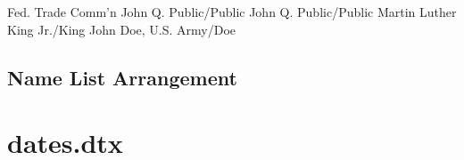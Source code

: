 \documentclass{article}
\begin{document}
    {Fed. Trade Comm'n}
\def\TestNameprocPerson#1#2#3{#3{#1/#2}}
\AssertCallback
    {\TestNameprocPerson}
    {John Q. Public/Public}
\AssertCallback
    {\TestNameprocPerson}
    {John Q. Public\hi@etal/Public\hi@etal}
\AssertCallback
    {\TestNameprocPerson}
    {Martin Luther King Jr.\hi@etal/King\hi@etal}
\AssertCallback
    {\TestNameprocPerson}
    {John Doe, U.S. Army/Doe}

\subsection{Name List Arrangement}

\begingroup

\hi@undefine\hi@kv@test
\let\hi@param@set@hooks\relax
{}\hi@kv@test
\AssertMacro{}
\hi@kv@test
\AssertMacro{}
\hi@kv@test
\AssertMacro{}
\hi@kv@test
\AssertMacro{}
\hi@kv@test
\AssertMacro{}

\hi@undefine\hi@kv@test
{}\hi@kv@test
{}\hi@kv@test
\AssertMacro{}
\hi@kv@test
{}\hi@kv@test
{}\hi@kv@test
\AssertMacro{}

\hi@undefine\hi@kv@test
{}\hi@kv@test
{}\hi@kv@test
{}\hi@kv@test
\AssertMacro{}
\hi@kv@test
{}\hi@kv@test
\AssertMacro{}

\endgroup


\section{dates.dtx}
\end{document}
